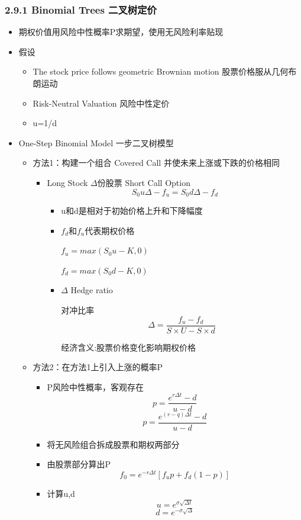 \documentclass[a4paper,6pt,twoside,openany]{article}
\begin{document}
\subsubsection*{2.9.1 Binomial Trees 二叉树定价}
\begin{itemize}
\item 期权价值用风险中性概率P求期望，使用无风险利率贴现
\item 假设
  \begin{itemize}
  \item The stock price follows geometric Brownian motion 股票价格服从几何布朗运动
  \item Risk-Neutral Valuation 风险中性定价
  \item u=1/d
  \end{itemize}
    
\item One-Step Binomial Model 一步二叉树模型
  \begin{itemize}
  \item 方法1：构建一个组合 Covered Call 并使未来上涨或下跌的价格相同
    \begin{itemize}
    \item Long Stock $\Delta$份股票 Short Call Option
      $$S_{0}u\Delta - f_{u} = S_{0}d\Delta - f_{d}$$
      \begin{itemize}
      \item u和d是相对于初始价格上升和下降幅度
      \item $f_{d}和f_{u}$代表期权价格
        \par $f_{u} = max(S_{0}u - K,0)$
        \par $f_{d} = max(S_{0}d - K ,0)$
      \item $\Delta$ Hedge ratio
        \par 对冲比率 $$\Delta = \frac{f_{u} - f_{d}}{S \times U - S \times d}$$
        \par 经济含义:股票价格变化影响期权价格
      \end{itemize}
    \end{itemize}
  \item 方法2：在方法1上引入上涨的概率P
    \begin{itemize}
    \item P风险中性概率，客观存在 $$p=\frac{e^{r\Delta t} - d}{u -
        d}$$ $$p=\frac{e^{(r-q)\Delta t} - d}{u - d}$$
    \item 将无风险组合拆成股票和期权两部分
    \item 由股票部分算出P $$f_{0}=e^{-r\Delta t}[f_{u}p + f_{d}(1-p)]$$
    \item 计算u,d $$u=e^{\sigma \sqrt{\Delta t}}$$$$d=e^{-\sigma \sqrt{\Delta
}}$$
\end{itemize}
\end{itemize}
\end{itemize}
\end{document}
